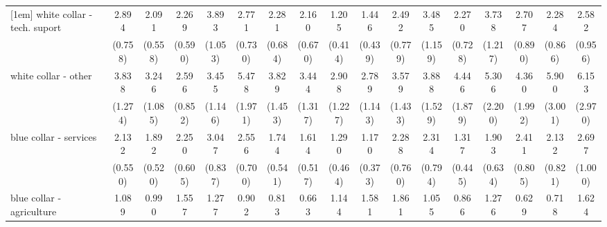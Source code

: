 {\begin{tabular}{l*{16}{c}}
[1em]
white collar - tech. suport&       2.894\sym{***}&       2.091\sym{**} &       2.269\sym{**} &       3.893\sym{***}&       2.771\sym{***}&       2.281\sym{**} &       2.160\sym{*}  &       1.205         &       1.446         &       2.492\sym{**} &       3.485\sym{***}&       2.270\sym{*}  &       3.738\sym{***}&       2.707\sym{**} &       2.284\sym{*}  &       2.582\sym{*}  \\
                    &     (0.758)         &     (0.558)         &     (0.590)         &     (1.053)         &     (0.730)         &     (0.684)         &     (0.670)         &     (0.414)         &     (0.439)         &     (0.779)         &     (1.159)         &     (0.728)         &     (1.217)         &     (0.890)         &     (0.866)         &     (0.956)         \\
[1em]
white collar - other&       3.838\sym{***}&       3.246\sym{***}&       2.596\sym{**} &       3.455\sym{***}&       5.478\sym{***}&       3.829\sym{***}&       3.444\sym{**} &       2.908\sym{*}  &       2.789\sym{*}  &       3.579\sym{**} &       3.888\sym{***}&       4.446\sym{***}&       5.306\sym{***}&       4.360\sym{**} &       5.900\sym{***}&       6.153\sym{***}\\
                    &     (1.274)         &     (1.085)         &     (0.852)         &     (1.146)         &     (1.971)         &     (1.453)         &     (1.317)         &     (1.227)         &     (1.143)         &     (1.433)         &     (1.529)         &     (1.879)         &     (2.200)         &     (1.992)         &     (3.001)         &     (2.970)         \\
[1em]
blue collar - services&       2.132\sym{**} &       1.892\sym{*}  &       2.250\sym{**} &       3.047\sym{***}&       2.556\sym{***}&       1.744         &       1.614         &       1.290         &       1.170         &       2.288\sym{*}  &       2.314\sym{*}  &       1.317         &       1.903         &       2.411\sym{**} &       2.132\sym{*}  &       2.697\sym{**} \\
                    &     (0.550)         &     (0.520)         &     (0.605)         &     (0.837)         &     (0.700)         &     (0.541)         &     (0.517)         &     (0.464)         &     (0.373)         &     (0.760)         &     (0.794)         &     (0.445)         &     (0.634)         &     (0.805)         &     (0.821)         &     (1.000)         \\
[1em]
blue collar - agriculture&       1.089         &       0.990         &       1.557         &       1.277         &       0.902         &       0.813         &       0.663         &       1.144         &       1.581         &       1.861         &       1.055         &       0.866         &       1.276         &       0.629         &       0.718         &       1.624         \\

\end{tabular}}
